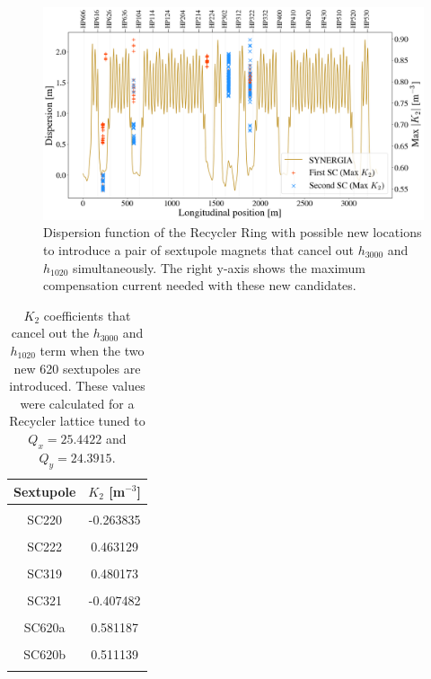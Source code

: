 \begin{figure}[H]
    \centering
    \includegraphics[width=\columnwidth]{chapter4/new_sexts_dx.png}
    \caption{Dispersion function of the Recycler Ring with possible new locations to introduce a pair of sextupole magnets that cancel out $h_{3000}$ and $h_{1020}$ simultaneously. The right y-axis shows the maximum compensation current needed with these new candidates.}
    \label{fig:dxnewsexts}
\end{figure}


\begin{table}[H]
    \centering
    \caption{$K_2$ coefficients that cancel out the $h_{3000}$ and $h_{1020}$ term when the two new 620 sextupoles are introduced. These values were calculated for a Recycler lattice tuned to $Q_x=25.4422$ and $Q_y=24.3915$.}
    \label{tab:k2s620}
    \begin{tabular}{cc}
    \toprule
    \textbf{Sextupole} & $K_2$ [m$^{-3}$] \\ \midrule
     &  \\
    SC220 & -0.263835 \\
     &  \\
    SC222 & 0.463129 \\
     &  \\
    SC319 & 0.480173 \\
     &  \\
    SC321 & -0.407482 \\
     &  \\
    SC620a & 0.581187 \\
     &  \\ 
    SC620b & 0.511139 \\
     &  \\ \bottomrule
    \end{tabular}
    \end{table}

